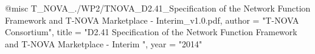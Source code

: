 @misc{ T_NOVA_./WP2/TNOVA_D2.41_Specification of the Network Function Framework and T-NOVA Marketplace - Interim_v1.0.pdf,
       author = "T-NOVA Consortium",
       title = "D2.41 Specification of the Network Function Framework and T-NOVA Marketplace - Interim ",
       year = "2014" }
